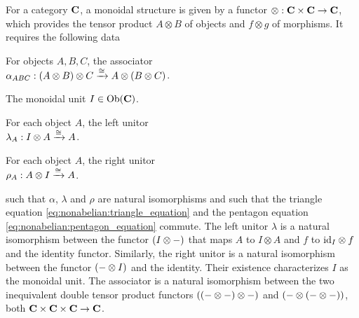\begin{doublecol}
\colswitch
    For a category $\mathbf{C}$, a monoidal structure is given by a functor $\otimes: \mathbf{C} \times \mathbf{C} \to \mathbf{C}$, which provides the tensor product $A \otimes B$ of objects and $f \otimes g$ of morphisms.
    It requires the following data
    \begin{halfcolitemize}
        \item For objects $A, B, C$, the associator\\$\alpha_{ABC}: (A \otimes B) \otimes C \xrightarrow{\cong} A \otimes (B \otimes C)$.
        \item The monoidal unit $I \in \mathrm{Ob}(\mathbf{C})$.
        \item For each object $A$, the left unitor\\ $\lambda_A: I \otimes A \xrightarrow{\cong} A$.
        \item For each object $A$, the right unitor\\ $\rho_A: A \otimes I \xrightarrow{\cong} A$.
    \end{halfcolitemize}
    such that $\alpha$, $\lambda$ and $\rho$ are natural isomorphisms and such that the triangle equation \eqref{eq:nonabelian:triangle_equation} and the pentagon equation \eqref{eq:nonabelian:pentagon_equation} commute.
    The left unitor $\lambda$ is a natural isomorphism between the functor $(I \otimes {-})$ that maps $A$ to $I \otimes A$ and $f$ to $\mathrm{id}_{I} \otimes f$ and the identity functor.
    Similarly, the right unitor is a natural isomorphism between the functor $({-} \otimes I)$ and the identity.
    Their existence characterizes $I$ as the monoidal unit.
    The associator is a natural isomorphism between the two inequivalent double tensor product functors $(({-} \otimes {-}) \otimes {-})$ and $({-} \otimes ({-} \otimes {-}))$, both $\mathbf{C} \times \mathbf{C} \times \mathbf{C} \to \mathbf{C}$.
\end{doublecol}
